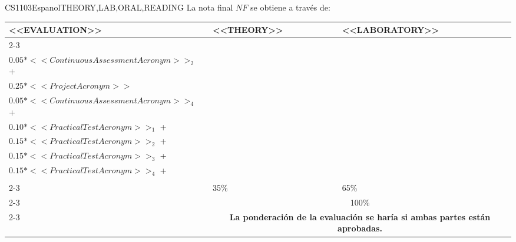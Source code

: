  
  \begin{evaluation}{CS1103}{Espanol}{THEORY,LAB,ORAL,READING}
  La nota final $NF$ se obtiene a través de:

  \begin{tabularx}{0.9\textwidth}{|X|p{}|p{}|} \hline
  \multirow{4}{*}{\uppercase{<<Evaluation>>}} & \uppercase{<<Theory>>} & \uppercase{<<Laboratory>>} \\ \cline{2-3}
  & %
      \begin{minipage}{0.95\textwidth}
      \begin{tabular}{l}
          $0.05*<<ContinuousAssessmentAcronym>>_{1}$  + \\
          $0.05*<<ContinuousAssessmentAcronym>>_{2}$  + \\
          $0.25*<<ProjectAcronym>>$
          \end{tabular} 
      \end{minipage} 
  & %
      \begin{minipage}{0.95\textwidth}
      \begin{tabular}{l}
        $0.05*<<ContinuousAssessmentAcronym>>_{3}$ + \\
        $0.05*<<ContinuousAssessmentAcronym>>_{4}$ + \\
        $0.10*<<PracticalTestAcronym>>_{1}$ + \\
        $0.15*<<PracticalTestAcronym>>_{2}$ + \\
        $0.15*<<PracticalTestAcronym>>_{3}$ + \\
        $0.15*<<PracticalTestAcronym>>_{4}$ + \\
      \end{tabular} 
      \end{minipage}                 \\ \cline{2-3}
  & %
  35\% 
  & %
  65\% \\ \cline{2-3}
  & \multicolumn{2}{c|}{100\%}  \\ \cline{2-3}
  & \multicolumn{2}{c|}{\textbf{La ponderación de la evaluación se haría si ambas partes están aprobadas.}}  \\ \hline
  \end{tabularx}
    

\end{evaluation}
